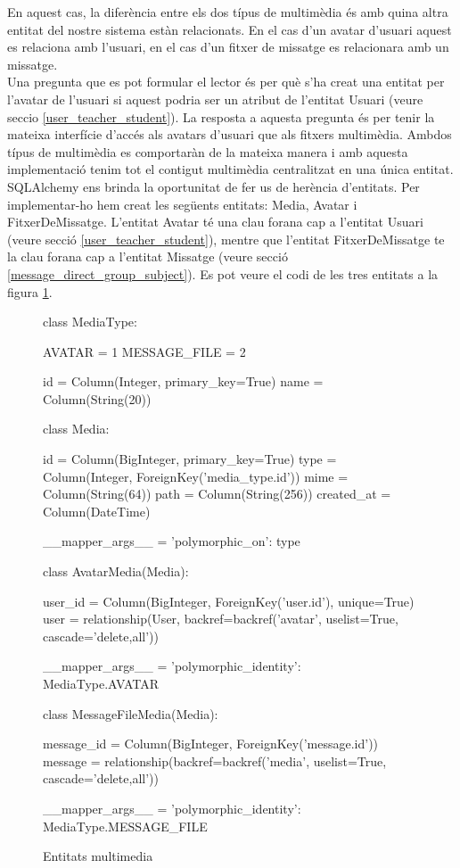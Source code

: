	En aquest cas, la diferència entre els dos típus de multimèdia és amb quina altra entitat del nostre sistema estàn relacionats. En el cas d'un avatar d'usuari aquest es relaciona amb l'usuari, en el cas d'un fitxer de missatge es relacionara amb un missatge.\\

	Una pregunta que es pot formular el lector és per què s'ha creat una entitat per l'avatar de l'usuari si aquest podria ser un atribut de l'entitat Usuari (veure seccio \ref{user_teacher_student}). La resposta a aquesta pregunta és per tenir la mateixa interfície d'accés als avatars d'usuari que als fitxers multimèdia. Ambdos típus de multimèdia es comportaràn de la mateixa manera i amb aquesta implementació tenim tot el contigut multimèdia centralitzat en una única entitat.	\\
	
	SQLAlchemy ens brinda la oportunitat de fer us de herència d'entitats. Per implementar-ho hem creat les següents entitats: Media, Avatar i FitxerDeMissatge. L'entitat Avatar té una clau forana cap a l'entitat Usuari (veure secció \ref{user_teacher_student}), mentre que l'entitat FitxerDeMissatge te la clau forana cap a l'entitat Missatge (veure secció \ref{message_direct_group_subject}). Es pot veure el codi de les tres entitats a la figura \ref{fig:entitats_multimedia}. \\
	

\begin{figure}[p]
	\begin{python}
class MediaType:
	
	AVATAR = 1
	MESSAGE_FILE = 2
		
	id = Column(Integer, primary_key=True)
	name = Column(String(20))
    	
class Media:

    id = Column(BigInteger, primary_key=True)
    type = Column(Integer, ForeignKey('media_type.id'))
    mime = Column(String(64))
    path = Column(String(256))
    created_at = Column(DateTime)

    __mapper_args__ = {'polymorphic_on': type}

class AvatarMedia(Media):
	
    user_id = Column(BigInteger, ForeignKey('user.id'), unique=True)
    user = relationship(User,  backref=backref('avatar', uselist=True, cascade='delete,all'))

    __mapper_args__ = {'polymorphic_identity': MediaType.AVATAR}

class MessageFileMedia(Media):

    message_id = Column(BigInteger, ForeignKey('message.id'))
    message = relationship(backref=backref('media', uselist=True, cascade='delete,all'))

    __mapper_args__ = {'polymorphic_identity': MediaType.MESSAGE_FILE}
    	
	\end{python}
    \caption{Entitats multimedia}
    \label{fig:entitats_multimedia}
\end{figure}
   
